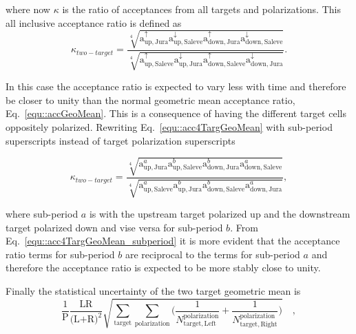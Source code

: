 \noindent
where now $\kappa$ is the ratio of acceptances from all targets and
polarizations.  This all inclusive acceptance ratio is defined as
\begin{equation}
  \label{equ::acc4TargGeoMean}
  \kappa_{two-target} =
  \frac{
    \sqrt[4]{
      \mathrm{a}^{\uparrow}_{\mathrm{up,Jura}}
      \mathrm{a}^{\downarrow}_{\mathrm{up,Saleve}}
      \mathrm{a}^{\uparrow}_{\mathrm{down,Jura}}
      \mathrm{a}^{\downarrow}_{\mathrm{down,Saleve}}}
  }{
    \sqrt[4]{
      \mathrm{a}^{\uparrow}_{\mathrm{up,Saleve}}
      \mathrm{a}^{\downarrow}_{\mathrm{up,Jura}}
      \mathrm{a}^{\uparrow}_{\mathrm{down,Saleve}}
      \mathrm{a}^{\downarrow}_{\mathrm{down,Jura}}}
  }.
\end{equation}

\noindent
In this case the acceptance ratio is expected to vary less with time and
therefore be closer to unity than the normal geometric mean acceptance ratio,
Eq.~\ref{equ::accGeoMean}.  This is a consequence of having the different target
cells oppositely polarized.  Rewriting Eq.~\ref{equ::acc4TargGeoMean} with
sub-period superscripts instead of target polarization superscripts

\begin{equation}
  \label{equ::acc4TargGeoMean_subperiod}
  \kappa_{two-target} = \frac{
    \sqrt[4]{
      \mathrm{a}^{a}_{\mathrm{up,Jura}}
      \mathrm{a}^{b}_{\mathrm{up,Saleve}}
      \mathrm{a}^{b}_{\mathrm{down,Jura}}
      \mathrm{a}^{a}_{\mathrm{down,Saleve}}}
  }{
    \sqrt[4]{
      \mathrm{a}^{a}_{\mathrm{up,Saleve}}
      \mathrm{a}^{b}_{\mathrm{up,Jura}}
      \mathrm{a}^{b}_{\mathrm{down,Saleve}}
      \mathrm{a}^{a}_{\mathrm{down,Jura}}}
  },
\end{equation}

\noindent
where sub-period $a$ is with the upstream target polarized up and the downstream
target polarized down and vise versa for sub-period $b$.  From
Eq.~\ref{equ::acc4TargGeoMean_subperiod} it is more evident that the acceptance
ratio terms for sub-period $b$ are reciprocal to the terms for sub-period $a$
and therefore the acceptance ratio is expected to be more stably close to unity.

Finally the statistical uncertainty of the two target geometric mean is
\begin{equation}
  \frac{1}{\mathrm{P}}
  \frac{\text{LR}}{\Big( \text{L+R} \Big)^2}
  \sqrt{
    \sum_{\mathrm{target}}\sum_{\mathrm{polarization}}
    \Big(
    \frac{1}{N_{\mathrm{target,Left}}^{\mathrm{polarization}}}
    +
    \frac{1}{N_{\mathrm{target,Right}}^{\mathrm{polarization}}}
    \Big)
  } \quad,
\end{equation}

